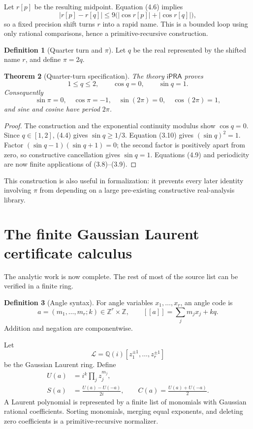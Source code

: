 \documentclass[11pt]{article}
\newtheorem{theorem}{Theorem}[section]
\theoremstyle{definition}
\newtheorem{definition}[theorem]{Definition}
\newcommand{\Z}{\mathbb Z}
\newcommand{\Q}{\mathbb Q}
\newcommand{\iPRA}{\mathsf{iPRA}}
\newcommand{\laur}{\mathcal L}
\newcommand{\abs}[1]{\left|#1\right|}
\newcommand{\sem}[1]{[\![#1]\!]}
\begin{document}
Let \(r[p]\) be the resulting midpoint.  Equation (4.6) implies
\[
 \abs{r[p]-r[q]}
 \le9\bigl(\abs{\cos r[p]}+\abs{\cos r[q]}\bigr),
 \tag{4.7}
\]
so a fixed precision shift turns \(r\) into a rapid name.  This is a bounded
loop using only rational comparisons, hence a primitive-recursive construction.

\begin{definition}[Quarter turn and \(\pi\)]
Let \(q\) be the real represented by the shifted name \(r\), and define
\(\pi=2q\).
\end{definition}

\begin{theorem}[Quarter-turn specification]
\label{thm:quarter}
The theory \(\iPRA\) proves
\[
 1\le q\le2,\qquad \cos q=0,\qquad \sin q=1.
 \tag{4.8}
\]
Consequently
\[
 \sin\pi=0,\quad \cos\pi=-1,\quad
 \sin(2\pi)=0,\quad \cos(2\pi)=1,
 \tag{4.9}
\]
and sine and cosine have period \(2\pi\).
\end{theorem}

\begin{proof}
The construction and the exponential continuity modulus show
\(\cos q=0\).  Since \(q\in[1,2]\), (4.4) gives \(\sin q\ge1/3\).  Equation
(3.10) gives \((\sin q)^2=1\).  Factor
\((\sin q-1)(\sin q+1)=0\); the second factor is positively apart from zero,
so constructive cancellation gives \(\sin q=1\).  Equations (4.9) and
periodicity are now finite applications of (3.8)--(3.9).
\end{proof}

This construction is also useful in formalization: it prevents every later
identity involving \(\pi\) from depending on a large pre-existing constructive
real-analysis library.

\section{The finite Gaussian Laurent certificate calculus}
\label{sec:certificate}

The analytic work is now complete.  The rest of most of the source list can be
verified in a finite ring.

\begin{definition}[Angle syntax]
For angle variables \(x_1,\ldots,x_r\), an angle code is
\[
 a=(m_1,\ldots,m_r;k)\in\Z^r\times\Z,
 \qquad
 \sem{a}=\sum_jm_jx_j+kq.
 \tag{5.1}
\]
Addition and negation are componentwise.
\end{definition}

Let
\[
 \laur=\Q(i)[z_1^{\pm1},\ldots,z_r^{\pm1}]
 \tag{5.2}
\]
be the Gaussian Laurent ring.  Define
\begin{align}
 U(a)&=i^k\prod_jz_j^{m_j},\tag{5.3}\\
 S(a)&=\frac{U(a)-U(-a)}{2i},\qquad
 C(a)=\frac{U(a)+U(-a)}2.\tag{5.4}
\end{align}
A Laurent polynomial is represented by a finite list of monomials with Gaussian
rational coefficients.  Sorting monomials, merging equal exponents, and deleting
zero coefficients is a primitive-recursive normalizer.
\end{document}
